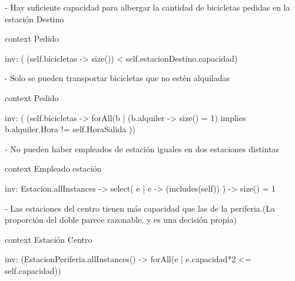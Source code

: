 - Hay suficiente capacidad para albergar la cantidad de bicicletas pedidas en la estación Destino

context Pedido

inv: ( (self.bicicletas -> size()) < self.estacionDestino.capacidad)



- Solo se pueden transportar bicicletas que no estén alquiladas

context Pedido

inv: ( (self.bicicletas -> forAll(b | (b.alquiler -> size() = 1) implies b.alquiler.Hora != self.HoraSalida  ))



- No pueden haber empleados de estación iguales en dos estaciones distintas

context Empleado estación

inv: Estacion.allInstances -> select( e | e -> (includes(self)) ) -> size() = 1



- Las estaciones del centro tienen más capacidad que las de la periferia.(La proporción del doble parece razonable, y es
una decisión propia)

context Estación Centro

inv: (EstacionPeriferia.allInstances() -> forAll(e | e.capacidad*2 <= self.capacidad))








